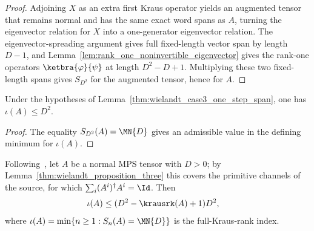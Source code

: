 \begin{proof}
    \leanok
    Adjoining $X$ as an extra first Kraus operator yields an augmented tensor
    that remains normal and has the same exact word spans as $A$, turning the
    eigenvector relation for $X$ into a one-generator eigenvector relation. The
    eigenvector-spreading argument gives full fixed-length vector span by
    length $D-1$, and Lemma~\ref{lem:rank_one_noninvertible_eigenvector} gives
    the rank-one operators $\ketbra{\varphi}{\psi}$ at length $D^2-D+1$.
    Multiplying these two fixed-length spans gives $S_{D^2}$ for the
    augmented tensor, hence for $A$.
\end{proof}

\begin{corollary}%
    \label{cor:wielandt_case3_one_step_index}
    \leanok
    Under the hypotheses of Lemma~\ref{thm:wielandt_case3_one_step_span},
    one has $\iota(A)\le D^2$.
\end{corollary}

\begin{proof}
    \leanok
    The equality $S_{D^2}(A)=\MN{D}$ gives an admissible value in the
    defining minimum for $\iota(A)$.
\end{proof}

\begin{theorem}%
    \label{thm:wielandt_general}
    \leanok
    Following~\cite[Theorem~1, case~(1)]{Sanz2010Quantum}, let $A$ be a
    normal MPS tensor with $D>0$; by
    Lemma~\ref{thm:wielandt_proposition_three} this covers the primitive
    channels of the source, for which $\sum_i(A^i)^\dagger A^i=\Id$.
    Then
    \begin{align}
        \iota(A)
         & \le(D^2-\krausrk(A)+1)D^2,
        \notag
    \end{align}
    where $\iota(A)=\min\{n\ge1:S_n(A)=\MN{D}\}$ is the
    full-Kraus-rank index.
\end{theorem}

